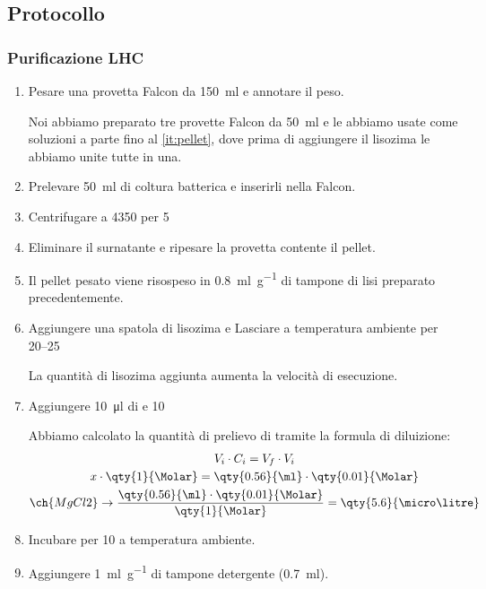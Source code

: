 \subsection{Protocollo}

\subsubsection{Purificazione LHC}
\begin{enumerate}
	\item Pesare una provetta Falcon da \qty{150}{\ml} e annotare il peso.
	\begin{Note}
		Noi abbiamo preparato tre provette Falcon da \qty{50}{\ml} e le abbiamo usate come soluzioni a parte fino al \autoref{it:pellet}, dove prima di aggiungere il lisozima le abbiamo unite tutte in una.
	\end{Note}
	\item Prelevare \qty{50}{\ml} di coltura batterica e inserirli nella Falcon.
	\item Centrifugare a \qty{4350}{\giri} per \qty{5}{\min}
	\item Eliminare il surnatante e ripesare la provetta contente il pellet.
	\item \label{it:pellet} Il pellet pesato viene risospeso in \qty{0.8}{\ml\per\g} di tampone di lisi preparato precedentemente.
	\item Aggiungere una spatola di lisozima e Lasciare a temperatura ambiente per \qtyrange{20}{25}{\min} 
	\begin{Informazione}
		La quantità di lisozima aggiunta aumenta la velocità di esecuzione.
	\end{Informazione}
	\item Aggiungere \qty{10}{\micro\litre} di  e \qty{10}{\milli\Molar} 
	\begin{myBox}
		Abbiamo calcolato la quantità di prelievo di  tramite la formula di diluizione:
		\begin{gather*}
			V_i \cdot C_i = V_f \cdot V_i \\
		 	x \cdot \qty{1}{\Molar}= \qty{0.56}{\ml} \cdot \qty{0.01}{\Molar}\\
			\ch{MgCl2} \rightarrow \frac{\qty{0.56}{\ml} \cdot \qty{0.01}{\Molar}}{\qty{1}{\Molar}} = \qty{5.6}{\micro\litre}
		\end{gather*}
	\end{myBox}
	\item Incubare per \qty{10}{\min} a temperatura ambiente.
	\item Aggiungere \qty{1}{\ml\per\g} di tampone detergente (\qty{0.7}{\ml}).

\end{enumerate}
